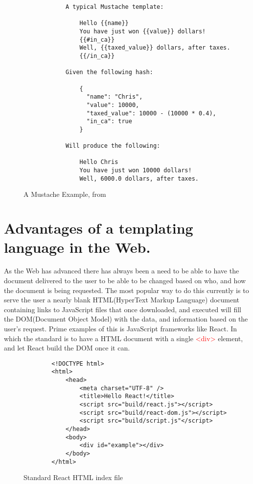 \begin{figure}[ht!]
    \small
    \begin{verbatim}
            A typical Mustache template:

                Hello {{name}}
                You have just won {{value}} dollars!
                {{#in_ca}}
                Well, {{taxed_value}} dollars, after taxes.
                {{/in_ca}}

            Given the following hash:

                {
                  "name": "Chris",
                  "value": 10000,
                  "taxed_value": 10000 - (10000 * 0.4),
                  "in_ca": true
                }

            Will produce the following:

                Hello Chris
                You have just won 10000 dollars!
                Well, 6000.0 dollars, after taxes.
    \end{verbatim}
    \caption{A Mustache Example, from \parencite{MustacheMan}}
    \label{fig:mustacheEx}
\end{figure}
\clearpage



\section{Advantages of a templating language in the Web.}
As the Web has advanced there has always been a need to be able to have the document delivered to the user to be able to be changed based on who, and how the document is being requested. The most popular way to do this currently is to serve the user a nearly blank HTML(HyperText Markup Language) document containing links to JavaScript files that once downloaded, and executed will fill the DOM(Document Object Model) with the data, and information based on the user's request. Prime examples of this is JavaScript frameworks like React. In which the standard is to have a HTML document with a single \textcolor{red}{<div>} element, and let React build the DOM once it can.

\begin{figure}[ht!]
    \small
    \begin{verbatim}
        <!DOCTYPE html>
        <html>
            <head>
                <meta charset="UTF-8" />
                <title>Hello React!</title>
                <script src="build/react.js"></script>
                <script src="build/react-dom.js"></script>
                <script src="build/script.js"</script>
            </head>
            <body>
                <div id="example"></div>
            </body>
        </html>
    \end{verbatim}
    \caption{Standard React HTML index file}
\end{figure}

